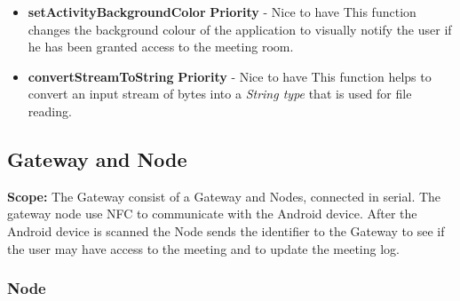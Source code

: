 \documentclass{article}
\begin{document}
\begin{itemize}
			\item \textbf{setActivityBackgroundColor}
				\newline\textbf{ Priority } - Nice to have
				\newline This function changes the background colour of the application to visually notify the user if he has been granted access to the meeting room.

			\item \textbf{convertStreamToString}
				\newline\textbf{ Priority } - Nice to have
				\newline This function helps to convert an input stream of bytes into a \textit{String type} that is used for file reading.


		\end{itemize}

\newpage		
		\subsection{Gateway and Node}
\textbf{Scope: }The Gateway consist of a Gateway and Nodes, connected in serial. The gateway node use NFC to communicate with the Android device. After the Android device is scanned the Node sends the identifier to the Gateway to see if the user may have access to the meeting and to update the meeting log. 

		\subsubsection{Node}
\end{document}

